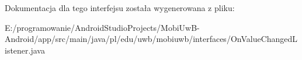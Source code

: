 Dokumentacja dla tego interfejsu została wygenerowana z pliku\+:\begin{DoxyCompactItemize}
\item 
E\+:/programowanie/\+Android\+Studio\+Projects/\+Mobi\+Uw\+B-\/\+Android/app/src/main/java/pl/edu/uwb/mobiuwb/interfaces/On\+Value\+Changed\+Listener.\+java\end{DoxyCompactItemize}
